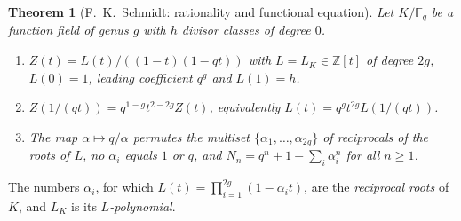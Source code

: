 \documentclass[11pt]{amsbook}
\theoremstyle{plain}
\newtheorem{theorem}{Theorem}[section]
\theoremstyle{definition}
\theoremstyle{remark}
\numberwithin{equation}{section}
\numberwithin{figure}{chapter}
\numberwithin{table}{chapter}
\newcommand{\Z}{\mathbb{Z}}
\newcommand{\F}{\mathbb{F}}
\begin{document}
\begin{theorem}[F.~K.~Schmidt: rationality and functional equation]
\label{thm:rationality}
Let $K/\F_q$ be a function field of genus $g$ with $h$ divisor
classes of degree $0$.
\begin{enumerate}
\item\label{item:rat-form} $Z(t)=L(t)/((1-t)(1-qt))$ with
$L=L_K\in\Z[t]$ of degree $2g$, $L(0)=1$, leading coefficient $q^g$
and $L(1)=h$.
\item\label{item:rat-fe} $Z(1/(qt))=q^{1-g}t^{2-2g}Z(t)$,
equivalently $L(t)=q^gt^{2g}L(1/(qt))$.
\item\label{item:rat-roots} The map $\alpha\mapsto q/\alpha$
permutes the multiset $\{\alpha_1,\dots,\alpha_{2g}\}$ of
reciprocals of the roots of $L$, no $\alpha_i$ equals $1$ or
$q$, and $N_n=q^n+1-\sum_i\alpha_i^n$ for all $n\ge1$.
\end{enumerate}
\end{theorem}

The numbers $\alpha_i$, for which
$L(t)=\prod_{i=1}^{2g}(1-\alpha_it)$, are the \emph{reciprocal
roots} of $K$, and $L_K$ is its \emph{$L$-polynomial}.
\end{document}
